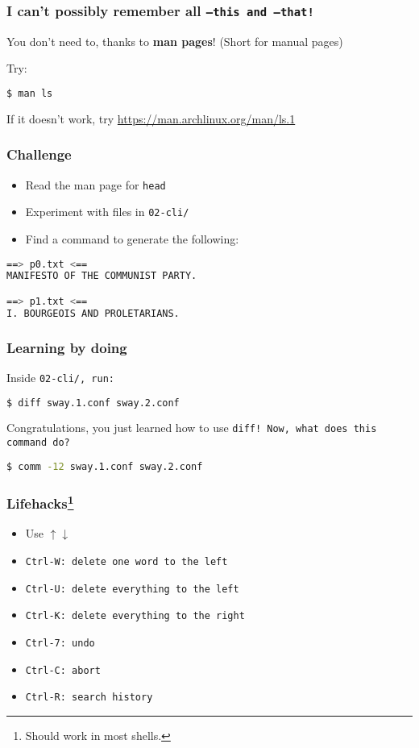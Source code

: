 \begin{frame}[fragile]
\frametitle{I can't possibly remember all \tt{--this} and \tt{--that}!}
You don't need to, thanks to \textbf{man pages}! (Short for manual pages)

Try:
\begin{lstlisting}[language=bash]
$ man ls
\end{lstlisting}

If it doesn't work, try \url{https://man.archlinux.org/man/ls.1}
\end{frame}

\begin{frame}[fragile]
\frametitle{Challenge}
\begin{itemize}
    \item Read the man page for \tt{head}
    \item Experiment with files in \tt{02-cli/}
    \item Find a command to generate the following:
\end{itemize}
\begin{lstlisting}[language=bash]
==> p0.txt <==
MANIFESTO OF THE COMMUNIST PARTY.

==> p1.txt <==
I. BOURGEOIS AND PROLETARIANS.
\end{lstlisting}
\end{frame}

\begin{frame}[fragile]
\frametitle{Learning by doing}
Inside \tt{02-cli/}, run:
\begin{lstlisting}[language=bash]
$ diff sway.1.conf sway.2.conf
\end{lstlisting}
Congratulations, you just learned how to use \tt{diff}!
\newline \newline
Now, what does this command do?
\begin{lstlisting}[language=bash]
$ comm -12 sway.1.conf sway.2.conf
\end{lstlisting}
\end{frame}

\begin{frame}
\frametitle{Lifehacks\footnote{Should work in most shells.}}
\begin{itemize}
    \item Use $\uparrow \downarrow$
    \item \tt{Ctrl-W}: delete one word to the left
    \item \tt{Ctrl-U}: delete everything to the left
    \item \tt{Ctrl-K}: delete everything to the right
    \item \tt{Ctrl-7}: undo
    \item \tt{Ctrl-C}: abort
    \item \tt{Ctrl-R}: search history
\end{itemize}
\end{frame}

